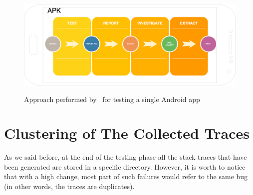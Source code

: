 \begin{figure}[tb]
\centering 
\includegraphics[width=12.5cm,height=5cm]{imgs/apkprocess} 
\caption{Approach performed by \toolname\ for testing a single Android app}
\label{fig: apkprocess}
\end{figure}



\clearpage
\section{Clustering of The Collected Traces}
\label{approach:clustering}
As we said before, at the end of the testing phase all the stack traces that have been generated are stored in a specific directory. However, it is worth to notice that with a high change, most part of such failures would refer to the same bug (in other words, the traces are duplicates).

